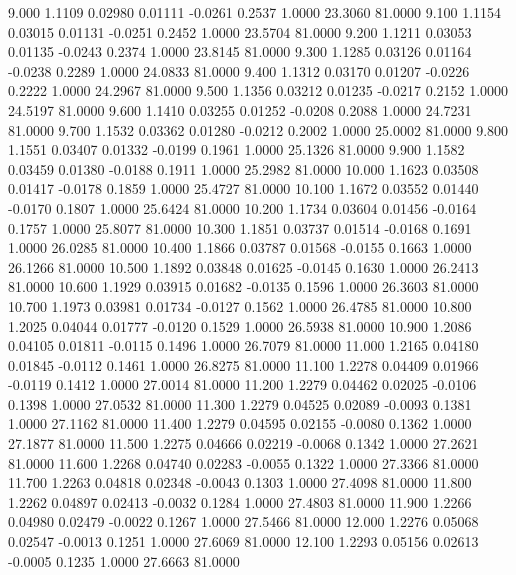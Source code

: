    9.000   1.1109   0.02980   0.01111  -0.0261   0.2537   1.0000  23.3060  81.0000
   9.100   1.1154   0.03015   0.01131  -0.0251   0.2452   1.0000  23.5704  81.0000
   9.200   1.1211   0.03053   0.01135  -0.0243   0.2374   1.0000  23.8145  81.0000
   9.300   1.1285   0.03126   0.01164  -0.0238   0.2289   1.0000  24.0833  81.0000
   9.400   1.1312   0.03170   0.01207  -0.0226   0.2222   1.0000  24.2967  81.0000
   9.500   1.1356   0.03212   0.01235  -0.0217   0.2152   1.0000  24.5197  81.0000
   9.600   1.1410   0.03255   0.01252  -0.0208   0.2088   1.0000  24.7231  81.0000
   9.700   1.1532   0.03362   0.01280  -0.0212   0.2002   1.0000  25.0002  81.0000
   9.800   1.1551   0.03407   0.01332  -0.0199   0.1961   1.0000  25.1326  81.0000
   9.900   1.1582   0.03459   0.01380  -0.0188   0.1911   1.0000  25.2982  81.0000
  10.000   1.1623   0.03508   0.01417  -0.0178   0.1859   1.0000  25.4727  81.0000
  10.100   1.1672   0.03552   0.01440  -0.0170   0.1807   1.0000  25.6424  81.0000
  10.200   1.1734   0.03604   0.01456  -0.0164   0.1757   1.0000  25.8077  81.0000
  10.300   1.1851   0.03737   0.01514  -0.0168   0.1691   1.0000  26.0285  81.0000
  10.400   1.1866   0.03787   0.01568  -0.0155   0.1663   1.0000  26.1266  81.0000
  10.500   1.1892   0.03848   0.01625  -0.0145   0.1630   1.0000  26.2413  81.0000
  10.600   1.1929   0.03915   0.01682  -0.0135   0.1596   1.0000  26.3603  81.0000
  10.700   1.1973   0.03981   0.01734  -0.0127   0.1562   1.0000  26.4785  81.0000
  10.800   1.2025   0.04044   0.01777  -0.0120   0.1529   1.0000  26.5938  81.0000
  10.900   1.2086   0.04105   0.01811  -0.0115   0.1496   1.0000  26.7079  81.0000
  11.000   1.2165   0.04180   0.01845  -0.0112   0.1461   1.0000  26.8275  81.0000
  11.100   1.2278   0.04409   0.01966  -0.0119   0.1412   1.0000  27.0014  81.0000
  11.200   1.2279   0.04462   0.02025  -0.0106   0.1398   1.0000  27.0532  81.0000
  11.300   1.2279   0.04525   0.02089  -0.0093   0.1381   1.0000  27.1162  81.0000
  11.400   1.2279   0.04595   0.02155  -0.0080   0.1362   1.0000  27.1877  81.0000
  11.500   1.2275   0.04666   0.02219  -0.0068   0.1342   1.0000  27.2621  81.0000
  11.600   1.2268   0.04740   0.02283  -0.0055   0.1322   1.0000  27.3366  81.0000
  11.700   1.2263   0.04818   0.02348  -0.0043   0.1303   1.0000  27.4098  81.0000
  11.800   1.2262   0.04897   0.02413  -0.0032   0.1284   1.0000  27.4803  81.0000
  11.900   1.2266   0.04980   0.02479  -0.0022   0.1267   1.0000  27.5466  81.0000
  12.000   1.2276   0.05068   0.02547  -0.0013   0.1251   1.0000  27.6069  81.0000
  12.100   1.2293   0.05156   0.02613  -0.0005   0.1235   1.0000  27.6663  81.0000
